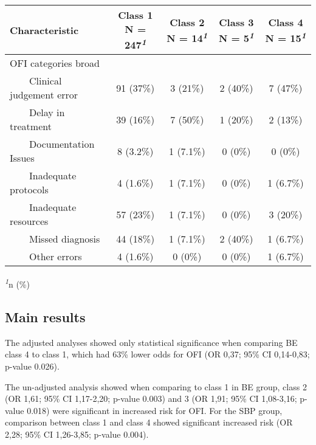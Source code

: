 \documentclass[
]{article}
\begin{document}
\begin{table}[!t]
\fontsize{12.0pt}{14.4pt}\selectfont
\begin{tabular*}{\linewidth}{@{\extracolsep{\fill}}lcccc}
\toprule
\textbf{Characteristic} & \textbf{Class 1}  N = 247\textsuperscript{\textit{1}} & \textbf{Class 2}  N = 14\textsuperscript{\textit{1}} & \textbf{Class 3}  N = 5\textsuperscript{\textit{1}} & \textbf{Class 4}  N = 15\textsuperscript{\textit{1}} \\ 
\midrule\addlinespace[2.5pt]
OFI categories broad &  &  &  &  \\ 
    Clinical judgement error & 91 (37\%) & 3 (21\%) & 2 (40\%) & 7 (47\%) \\ 
    Delay in treatment & 39 (16\%) & 7 (50\%) & 1 (20\%) & 2 (13\%) \\ 
    Documentation Issues & 8 (3.2\%) & 1 (7.1\%) & 0 (0\%) & 0 (0\%) \\ 
    Inadequate protocols & 4 (1.6\%) & 1 (7.1\%) & 0 (0\%) & 1 (6.7\%) \\ 
    Inadequate resources & 57 (23\%) & 1 (7.1\%) & 0 (0\%) & 3 (20\%) \\ 
    Missed diagnosis & 44 (18\%) & 1 (7.1\%) & 2 (40\%) & 1 (6.7\%) \\ 
    Other errors & 4 (1.6\%) & 0 (0\%) & 0 (0\%) & 1 (6.7\%) \\ 
\bottomrule
\end{tabular*}
\begin{minipage}{\linewidth}
\textsuperscript{\textit{1}}n (\%)\\
\end{minipage}
\end{table}

\hypertarget{main-results}{%
\subsection{Main results}\label{main-results}}

The adjusted analyses showed only statistical significance when
comparing BE class 4 to class 1, which had 63\% lower odds for OFI (OR
0,37; 95\% CI 0,14-0,83; p-value 0.026).

The un-adjusted analysis showed when comparing to class 1 in BE group,
class 2 (OR 1,61; 95\% CI 1,17-2,20; p-value 0.003) and 3 (OR 1,91; 95\%
CI 1,08-3,16; p-value 0.018) were significant in increased risk for OFI.
For the SBP group, comparison between class 1 and class 4 showed
significant increased risk (OR 2,28; 95\% CI 1,26-3,85; p-value 0.004).
\end{document}
